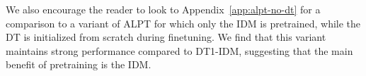 \documentclass{article} %
\begin{document}
We also encourage the reader to look to Appendix~\ref{app:alpt-no-dt} for a comparison to a variant of ALPT for which only the IDM is pretrained, while the DT is initialized from scratch during finetuning. We find that this variant maintains strong performance compared to DT1-IDM, suggesting that the main benefit of pretraining is the IDM.

\begin{figure}[]
\centering
{} 
 \\
\centering
{} 

\end{figure}
\end{document}
